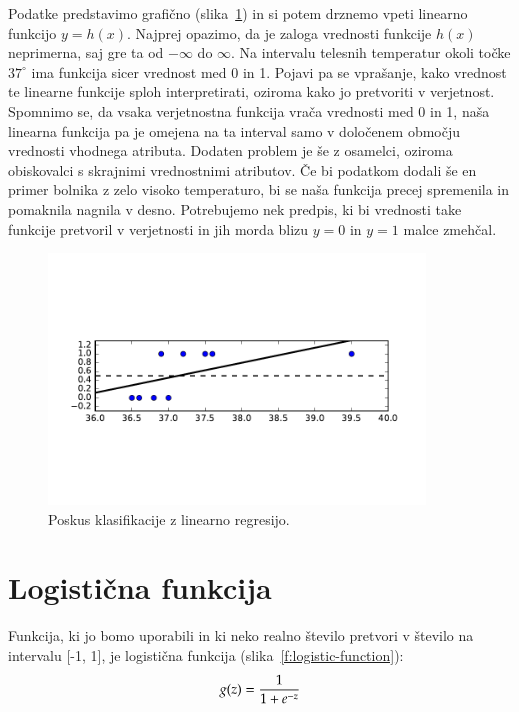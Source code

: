 Podatke predstavimo grafično (slika~\ref{f:class-linreg}) in si potem drznemo vpeti linearno funkcijo $y=h(x)$. Najprej opazimo, da je zaloga vrednosti funkcije $h(x)$ neprimerna, saj gre ta od $-\infty$ do $\infty$. Na intervalu telesnih temperatur okoli točke $37^{\circ}$ ima funkcija sicer vrednost med 0 in 1. Pojavi pa se vprašanje, kako vrednost te linearne funkcije sploh interpretirati, oziroma kako jo pretvoriti v verjetnost. Spomnimo se, da vsaka verjetnostna funkcija vrača vrednosti med 0 in 1, naša linearna funkcija pa je omejena na ta interval samo v določenem območju vrednosti vhodnega atributa. Dodaten problem je še z osamelci, oziroma obiskovalci s skrajnimi vrednostnimi atributov. Če bi podatkom dodali še en primer bolnika z zelo visoko temperaturo, bi se naša funkcija precej spremenila in pomaknila nagnila v desno. Potrebujemo nek predpis, ki bi vrednosti take funkcije pretvoril v verjetnosti in jih morda blizu $y=0$ in $y=1$ malce zmehčal.

\begin{figure}[htbp]
\begin{center}
\includegraphics[width=10cm]{slike/class-linreg.pdf}
\caption{Poskus klasifikacije z linearno regresijo.}
\label{f:class-linreg}
\end{center}
\end{figure}

\section{Logistična funkcija}

Funkcija, ki jo bomo uporabili in ki neko realno število pretvori v število na intervalu [-1, 1], je logistična funkcija (slika~\ref{f:logistic-function}):
\begin{equation}
  g(z) = {1\over 1+e^{-z}}
\end{equation}

